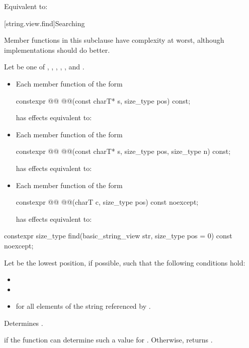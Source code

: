 \begin{itemdescr}
\pnum
\effects
Equivalent to: 
\end{itemdescr}

[string.view.find]{Searching}

\pnum
Member functions in this subclause have complexity  at worst,
although implementations should do better.

\pnum
Let  be one of
,
,
,
,
,
and
.
\begin{itemize}
\item
Each member function of the form
\begin{codeblock}
constexpr @@ @@(const charT* s, size_type pos) const;
\end{codeblock}
has effects equivalent to: 

\item
Each member function of the form
\begin{codeblock}
constexpr @@ @@(const charT* s, size_type pos, size_type n) const;
\end{codeblock}
has effects equivalent to: 

\item
Each member function of the form
\begin{codeblock}
constexpr @@ @@(charT c, size_type pos) const noexcept;
\end{codeblock}
has effects equivalent to: 
\end{itemize}

%
\begin{itemdecl}
constexpr size_type find(basic_string_view str, size_type pos = 0) const noexcept;
\end{itemdecl}

\begin{itemdescr}
\pnum
Let  be the lowest position, if possible, such that the following conditions hold:
\begin{itemize}
\item
{}
\item
{}
\item
{} for all elements  of the string referenced by .
\end{itemize}

\pnum
\effects
Determines .

\pnum
\returns
{} if the function can determine such a value for .
Otherwise, returns .
\end{itemdescr}


